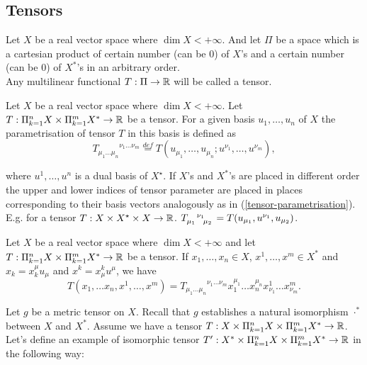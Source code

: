 \documentclass[main.tex]{subfiles}
\begin{document}
\subsection{Tensors}

\begin{definition}
Let $X$ be a real vector space where $\dim X < +\infty$. And let $\Pi$ be a space which is a cartesian product of certain number (can be 0) of $X$'s and a certain number (can be 0) of $X^*$'s in an arbitrary order.\\

\noindent
Any multilinear functional $T:\Pi\to\mathbb{R}$ will be called a tensor. 
\end{definition}

Let $X$ be a real vector space where $\dim X < +\infty$.
Let $T:\Pi_{k=1}^n X \times \Pi_{k=1}^m X^*\to\mathbb{R}$ be a tensor. For a given basis $u_1, \dots, u_n$ of $X$ the parametrisation of tensor $T$ in this basis is defined as
\begin{equation}
\label{tensor-parametrisation}
{T_{\mu_1\dots\mu_n}}^{\nu_1\dots\nu_m} \stackrel{def}{=} 
T(u_{\mu_1}, \dots, u_{\mu_n}; u^{\nu_1}, \dots, u^{\nu_m}),
\end{equation} 

where $u^1, \dots, u^n$ is a dual basis of $X^\star$. If $X$'s and $X^*$'s are placed in different order the upper and lower indices of tensor parameter are placed in places corresponding to their basis vectors analogously as in (\ref{tensor-parametrisation}). E.g. for a tensor $T:X\times X^\star\times X\to\mathbb{R}$. 
$\tensor{T}{_{\mu_1}^{\nu_1}_{\mu_2}} = T(u_{\mu_1}, u^{\nu_1}, u_{\mu_2})$.

\begin{corollary}
Let $X$ be a real vector space where $\dim X < +\infty$ and let $T:\Pi_{k=1}^n X \times \Pi_{k=1}^m X^*\to\mathbb{R}$ be a tensor. If $x_1, \dots, x_n\in X$,
$x^1, \dots, x^m\in X^*$ and
$x_k = x^\mu_k u_\mu$ and $x^k = x^k_\mu u^\mu$, we have
\begin{equation}
\label{tensor-param-definition}
T(x_1, \dots x_n, x^1, \dots, x^m) = {T_{\mu_1\dots\mu_n}}^{\nu_1\dots\nu_m} 
x_1^{\mu_1} \dots x_n^{\mu_n} x^1_{\nu_1} \dots x^m_{\nu_m}.
\end{equation}
\end{corollary}


Let $g$ be a metric tensor on $X$. Recall that $g$ establishes a natural isomorphism $\cdot^*$ between $X$ and $X^*$. Assume we have a tensor $T:X \times \Pi_{k=1}^n X \times \Pi_{k=1}^m X^*\to\mathbb{R}$. Let's define an example of isomorphic tensor $T': X^* \times \Pi_{k=1}^n X \times \Pi_{k=1}^m X^*\to\mathbb{R}$ in the following way: 
\end{document}
